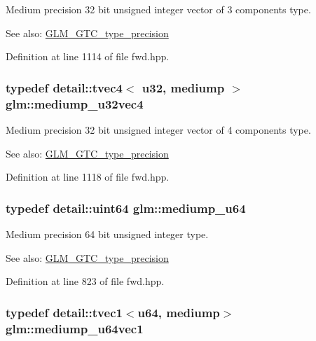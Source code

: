 Medium precision 32 bit unsigned integer vector of 3 components type. \begin{Desc}
\item[See also:]\hyperlink{group__gtc__type__precision}{GLM\_\-GTC\_\-type\_\-precision} \end{Desc}


Definition at line 1114 of file fwd.hpp.\hypertarget{group__gtc__type__precision_g532f59ac4c36a7e1371341165f7be33b}{
\subsubsection[mediump\_\-u32vec4]{\setlength{\rightskip}{0pt plus 5cm}typedef detail::tvec4$<$ u32, mediump $>$ {\bf glm::mediump\_\-u32vec4}}}
\label{group__gtc__type__precision_g532f59ac4c36a7e1371341165f7be33b}


Medium precision 32 bit unsigned integer vector of 4 components type. \begin{Desc}
\item[See also:]\hyperlink{group__gtc__type__precision}{GLM\_\-GTC\_\-type\_\-precision} \end{Desc}


Definition at line 1118 of file fwd.hpp.\hypertarget{group__gtc__type__precision_g00c51a16fa190b0a90205d50d6d8a44a}{
\subsubsection[mediump\_\-u64]{\setlength{\rightskip}{0pt plus 5cm}typedef detail::uint64 {\bf glm::mediump\_\-u64}}}
\label{group__gtc__type__precision_g00c51a16fa190b0a90205d50d6d8a44a}


Medium precision 64 bit unsigned integer type. \begin{Desc}
\item[See also:]\hyperlink{group__gtc__type__precision}{GLM\_\-GTC\_\-type\_\-precision} \end{Desc}


Definition at line 823 of file fwd.hpp.\hypertarget{group__gtc__type__precision_gf4211dc9e211d57b34b45a612b6de193}{
\subsubsection[mediump\_\-u64vec1]{\setlength{\rightskip}{0pt plus 5cm}typedef detail::tvec1$<$u64, mediump$>$ {\bf glm::mediump\_\-u64vec1}}}
\label{group__gtc__type__precision_gf4211dc9e211d57b34b45a612b6de193}


